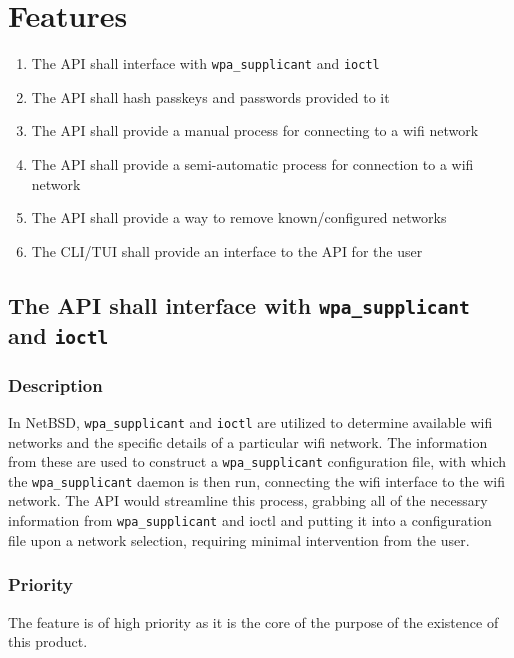\section{Features}

\begin{enumerate}
  \item The API shall interface with \texttt{wpa\_supplicant} and \texttt{ioctl}
  \item The API shall hash passkeys and passwords provided to it
  \item The API shall provide a manual process for connecting to a wifi network
  \item The API shall provide a semi-automatic process for connection to a wifi network
  \item The API shall provide a way to remove known/configured networks
  \item The CLI/TUI shall provide an interface to the API for the user
\end{enumerate}


\subsection{The API shall interface with \texttt{wpa\_supplicant} and \texttt{ioctl}}
\subsubsection{Description}
In NetBSD, \texttt{wpa\_supplicant} and \texttt{ioctl} are utilized to determine available wifi networks and
the specific details of a particular wifi network. The information from these are used to
construct a \texttt{wpa\_supplicant} configuration file, with which the \texttt{wpa\_supplicant} daemon is
then run, connecting the wifi interface to the wifi network. The API would streamline this
process, grabbing all of the necessary information from \texttt{wpa\_supplicant} and ioctl
and putting it into a configuration file upon a network selection, requiring minimal
intervention from the user.
\subsubsection{Priority}
The feature is of high priority as it is the core of the purpose of the existence of this 
product.

